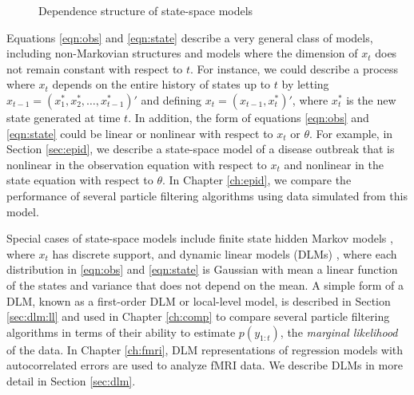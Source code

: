 \begin{figure}[ht]
\centering
\caption{Dependence structure of state-space models} \label{fig:ssdraw}
\end{figure}

Equations \eqref{eqn:obs} and \eqref{eqn:state} describe a very general class of models, including non-Markovian structures and models where the dimension of $x_t$ does not remain constant with respect to $t$. For instance, we could describe a process where $x_t$ depends on the entire history of states up to $t$ by letting $x_{t-1} = (x^*_1, x^*_2, \ldots, x^*_{t-1})'$ and defining $x_t = (x_{t-1}, x^*_t)'$, where $x^*_t$ is the new state generated at time $t$. In addition, the form of equations \eqref{eqn:obs} and \eqref{eqn:state} could be linear or nonlinear with respect to $x_t$ or $\theta$. For example, in Section \ref{sec:epid}, we describe a state-space model of a disease outbreak that is nonlinear in the observation equation with respect to $x_t$ and nonlinear in the state equation with respect to $\theta$. In Chapter \ref{ch:epid}, we compare the performance of several particle filtering algorithms using data simulated from this model.

Special cases of state-space models include finite state hidden Markov models \citep{cappe:2005:inference}, where $x_t$ has discrete support, and dynamic linear models (DLMs) \citep{West:Harr:baye:1997, petris:camp:2009:dynamic}, where each distribution in \eqref{eqn:obs} and \eqref{eqn:state} is Gaussian with mean a linear function of the states and variance that does not depend on the mean. A simple form of a DLM, known as a first-order DLM or local-level model, is described in Section \ref{sec:dlm:ll} and used in Chapter \ref{ch:comp} to compare several particle filtering algorithms in terms of their ability to estimate $p(y_{1:t})$, the \emph{marginal likelihood} of the data. In Chapter \ref{ch:fmri}, DLM representations of regression models with autocorrelated errors are used to analyze fMRI data. We describe DLMs in more detail in Section \ref{sec:dlm}.

